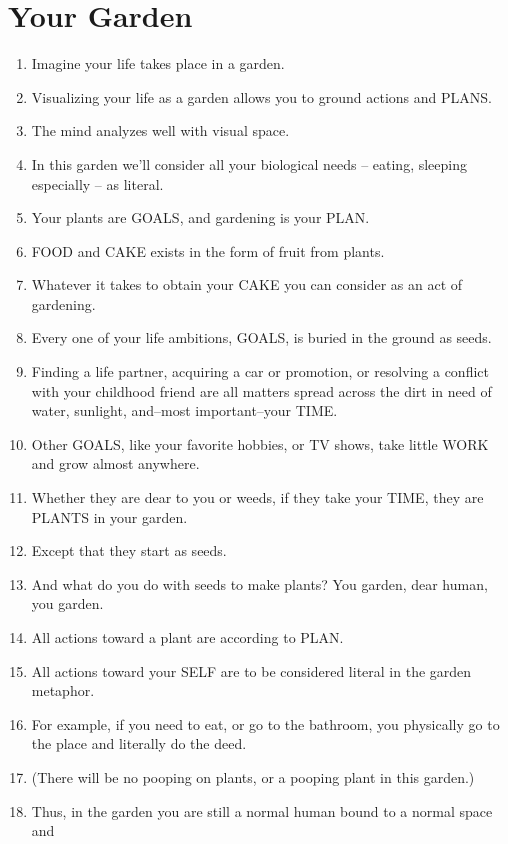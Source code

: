 \documentclass[
]{book}
\begin{document}
\hypertarget{your-garden}{%
\section{Your Garden}\label{your-garden}}

\begin{enumerate}
\def\labelenumi{\arabic{enumi}.}
\item
  Imagine your life takes place in a garden.
\item
  Visualizing your life as a garden allows you to ground actions and PLANS.
\item
  The mind analyzes well with visual space.
\item
  In this garden we'll consider all your biological needs -- eating, sleeping especially -- as literal.
\item
  Your plants are GOALS, and gardening is your PLAN.
\item
  FOOD and CAKE exists in the form of fruit from plants.
\item
  Whatever it takes to obtain your CAKE you can consider as an act of gardening.
\item
  Every one of your life ambitions, GOALS, is buried in the ground as seeds.
\item
  Finding a life partner, acquiring a car or promotion, or resolving a conflict with
  your childhood friend are all matters spread across the dirt in need of water,
  sunlight, and--most important--your TIME.
\item
  Other GOALS, like your favorite hobbies, or TV shows, take little WORK and
  grow almost anywhere.
\item
  Whether they are dear to you or weeds, if they take your TIME, they are PLANTS
  in your garden.
\item
  Except that they start as seeds.
\item
  And what do you do with seeds to make plants? You garden, dear human, you
  garden.
\item
  All actions toward a plant are according to PLAN.
\item
  All actions toward your SELF are to be considered literal in the garden
  metaphor.
\item
  For example, if you need to eat, or go to the bathroom, you physically go to the
  place and literally do the deed.
\item
  (There will be no pooping on plants, or a pooping plant in this garden.)
\item
  Thus, in the garden you are still a normal human bound to a normal space and

\end{enumerate}
\end{document}
